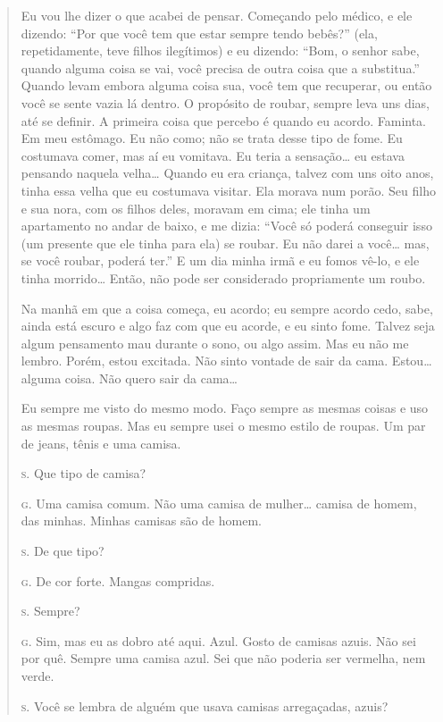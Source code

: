 \begin{quote}
Eu vou lhe dizer o que acabei de pensar. Começando pelo médico, e
ele dizendo: ``Por que você tem que estar sempre tendo
bebês?'' (ela, repetidamente, teve filhos ilegítimos) e eu
dizendo: ``Bom, o senhor sabe, quando alguma coisa se vai,
você precisa de outra coisa que a substitua.'' Quando
levam embora alguma coisa sua, você tem que recuperar, ou então você se
sente vazia lá dentro. O propósito de roubar, sempre leva uns dias, até
se definir. A primeira coisa que percebo é quando eu acordo. Faminta.
Em meu estômago. Eu não como; não se trata desse tipo de fome. Eu
costumava comer, mas aí eu vomitava. Eu teria a sensação\ldots{} eu estava
pensando naquela velha\ldots{} Quando eu era criança, talvez com uns oito
anos, tinha essa velha que eu costumava visitar. Ela morava num porão.
Seu filho e sua nora, com os filhos deles, moravam em cima; ele tinha
um apartamento no andar de baixo, e me dizia: ``Você só
poderá conseguir isso (um presente que ele tinha para ela) se roubar.
Eu não darei a você\ldots{} mas, se você roubar, poderá ter.''
E um dia minha irmã e eu fomos vê-lo, e ele tinha morrido\ldots{} Então, não
pode ser considerado propriamente um roubo.

Na manhã em que a coisa começa, eu acordo; eu sempre acordo cedo,
sabe, ainda está escuro e algo faz com que eu acorde, e eu sinto fome.
Talvez seja algum pensamento mau durante o sono, ou algo assim. Mas eu
não me lembro. Porém, estou excitada. Não sinto vontade de sair da
cama. Estou\ldots{} alguma coisa. Não quero sair da cama\ldots{}

Eu sempre me visto do mesmo modo. Faço sempre as mesmas coisas e uso
as mesmas roupas. Mas eu sempre usei o mesmo estilo de roupas. Um par
de jeans, tênis e uma camisa.

\noindent\hskip0mm\textsc{s.} Que tipo de camisa?

\noindent\hskip0mm\textsc{g.} Uma camisa comum. Não uma camisa de mulher\ldots{} camisa de homem, das
minhas. Minhas camisas são de homem.

\noindent\hskip0mm\textsc{s.} De que tipo?

\noindent\hskip0mm\textsc{g.} De cor forte. Mangas compridas.

\noindent\hskip0mm\textsc{s.} Sempre?

\noindent\hskip0mm\textsc{g.} Sim, mas eu as dobro até aqui. Azul. Gosto de camisas azuis. Não sei
por quê. Sempre uma camisa azul. Sei que não poderia ser vermelha, nem
verde.

\noindent\hskip0mm\textsc{s.} Você se lembra de alguém que usava camisas arregaçadas, azuis?


\end{quote}
